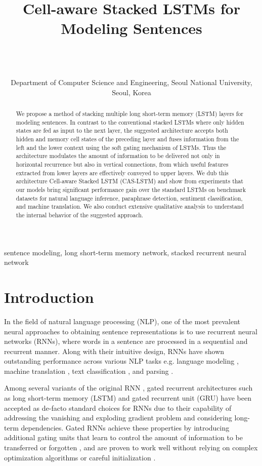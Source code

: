 \documentclass[wcp]{jmlr}
\title[Cell-aware Stacked LSTMs for Modeling Sentences]{Cell-aware Stacked LSTMs for Modeling Sentences}
\author{}
\author{\Name{Jihun Choi} \Email{jhchoi@europa.snu.ac.kr}\\
    \Name{Taeuk Kim} \Email{taeuk@europa.snu.ac.kr}\\
    \Name{Sang-goo Lee} \Email{sglee@europa.snu.ac.kr}\\
    \addr Department of Computer Science and Engineering, Seoul National University, Seoul, Korea}
\begin{document}
    
    \maketitle
    
    \begin{abstract}
        We propose a method of stacking multiple long short-term memory (LSTM) layers for modeling sentences.
        In contrast to the conventional stacked LSTMs where only hidden states are fed as input to the next layer, the suggested architecture accepts both hidden and memory cell states of the preceding layer and fuses information from the left and the lower context using the soft gating mechanism of LSTMs.
        Thus the architecture modulates the amount of information to be delivered not only in horizontal recurrence but also in vertical connections, from which useful features extracted from lower layers are effectively conveyed to upper layers.
        We dub this architecture Cell-aware Stacked LSTM (CAS-LSTM) and show from experiments that our models bring significant performance gain over the standard LSTMs on benchmark datasets for natural language inference, paraphrase detection, sentiment classification, and machine translation.
        We also conduct extensive qualitative analysis to understand the internal behavior of the suggested approach.
    \end{abstract}
    \begin{keywords}
        sentence modeling, long short-term memory network, stacked recurrent neural network
    \end{keywords}
    
    \section{Introduction}
    \label{sec:intro}
    In the field of natural language processing (NLP), one of the most prevalent neural approaches to obtaining sentence representations is to use recurrent neural networks (RNNs), where words in a sentence are processed in a sequential and recurrent manner.
    Along with their intuitive design, RNNs have shown outstanding performance across various NLP tasks e.g. language modeling \citep{mikolov2010rnnlm,graves2013generating}, machine translation \citep{cho2014nmt,sutskever2014sequence,bahdanau2015nmt}, text classification \citep{zhou2015c,tang2015document}, and parsing \citep{kiperwasser2016parsing,dyer2016rnng}.
    
    Among several variants of the original RNN \citep{elman1990finding}, 
    gated recurrent architectures such as long short-term memory (LSTM) \citep{hochreiter1997long} and gated recurrent unit (GRU) \citep{cho2014nmt} have been accepted as de-facto standard choices for RNNs
    due to their capability of addressing the vanishing and exploding gradient  problem and considering long-term dependencies.
    Gated RNNs achieve these properties by introducing additional gating units that learn to control the amount of information to be transferred or forgotten \citep{goodfellow2016deeplearningboook},
    and are proven to work well without relying on complex optimization algorithms or careful initialization \citep{sutskever2013training}.
    
\end{document}
